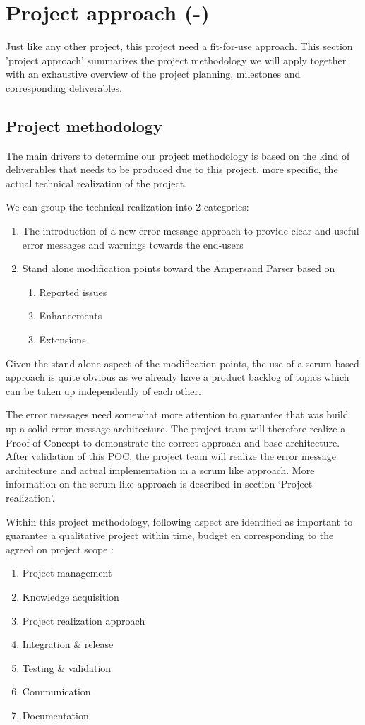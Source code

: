 \section{Project approach (-)}
\label{sec:project-approach}
Just like any other project, this project need a fit-for-use approach. 
This section 'project approach' summarizes the project methodology we will apply together with an exhaustive overview of the project planning, milestones and corresponding deliverables.
\subsection{Project methodology}
The main drivers to determine our project methodology is based on the kind of deliverables that needs to be produced due to this project, more specific, the actual technical realization of the project.

We can group the technical realization into 2 categories:
\begin{enumerate}
	\item The introduction of a new error message approach to provide clear and useful error messages and warnings towards the end-users
	\item Stand alone modification points toward the Ampersand Parser based on
	\begin{enumerate}
		\item Reported issues
		\item Enhancements
		\item Extensions
	\end {enumerate}
\end {enumerate}

Given the stand alone aspect of the modification points, the use of a scrum based approach is quite obvious as we already have a product backlog of topics which can be taken up independently of each other. 

The error messages need somewhat more attention to guarantee that was build up a solid error message architecture. The project team will therefore realize a Proof-of-Concept to demonstrate the correct approach and base architecture. After validation of this POC, the project team will realize the error message architecture and actual implementation in a scrum like approach.
More information on the scrum like approach is described in section ‘Project realization’.


Within this project methodology, following aspect are identified as important to guarantee a qualitative project within time, budget en corresponding to the agreed on project scope : 
\begin{enumerate}
	\item Project management
	\item Knowledge acquisition 
	\item Project realization approach
	\item Integration \& release
	\item Testing \& validation
	\item Communication
	\item Documentation
\end {enumerate}

